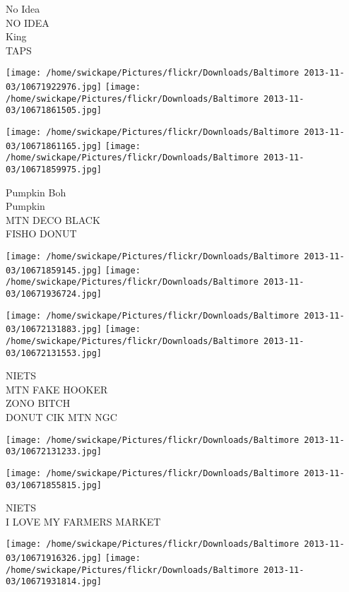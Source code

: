 \documentclass[10pt,letterpaper]{article}
\begin{document}
No Idea\\
NO IDEA\\
King\\
TAPS\\
\pagebreak

\texttt{[image: /home/swickape/Pictures/flickr/Downloads/Baltimore 2013-11-03/10671922976.jpg]}
\texttt{[image: /home/swickape/Pictures/flickr/Downloads/Baltimore 2013-11-03/10671861505.jpg]}

\texttt{[image: /home/swickape/Pictures/flickr/Downloads/Baltimore 2013-11-03/10671861165.jpg]}
\texttt{[image: /home/swickape/Pictures/flickr/Downloads/Baltimore 2013-11-03/10671859975.jpg]}

Pumpkin Boh\\
Pumpkin\\
MTN DECO BLACK\\
FISHO DONUT\\
\pagebreak

\texttt{[image: /home/swickape/Pictures/flickr/Downloads/Baltimore 2013-11-03/10671859145.jpg]}
\texttt{[image: /home/swickape/Pictures/flickr/Downloads/Baltimore 2013-11-03/10671936724.jpg]}

\texttt{[image: /home/swickape/Pictures/flickr/Downloads/Baltimore 2013-11-03/10672131883.jpg]}
\texttt{[image: /home/swickape/Pictures/flickr/Downloads/Baltimore 2013-11-03/10672131553.jpg]}

NIETS\\
MTN FAKE HOOKER\\
ZONO BITCH\\
DONUT CIK MTN NGC\\
\pagebreak

\texttt{[image: /home/swickape/Pictures/flickr/Downloads/Baltimore 2013-11-03/10672131233.jpg]}

\vspace{0.25in}
\texttt{[image: /home/swickape/Pictures/flickr/Downloads/Baltimore 2013-11-03/10671855815.jpg]}

NIETS\\
I LOVE MY FARMERS MARKET\\
\pagebreak

\texttt{[image: /home/swickape/Pictures/flickr/Downloads/Baltimore 2013-11-03/10671916326.jpg]}
\texttt{[image: /home/swickape/Pictures/flickr/Downloads/Baltimore 2013-11-03/10671931814.jpg]}
\end{document}
